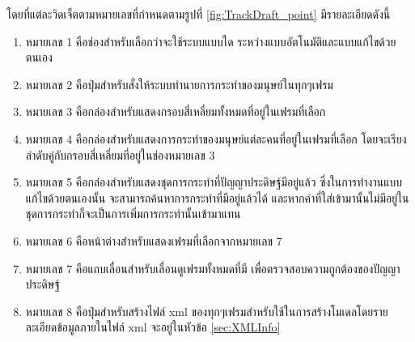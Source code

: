 โดยที่แต่ละวิดเจ็ตตามหมายเลขที่กำหนดตามรูปที่ \ref{fig:TrackDraft_point} มีรายละเอียดดังนี้
\begin{enumerate}
	\setlength\itemsep{-0.25em}
    \item หมายเลข 1 คือช่องสำหรับเลือกว่าจะใช้ระบบแบบใด ระหว่างแบบอัตโนมัติและแบบแก้ไขด้วยตนเอง
    \item หมายเลข 2 คือปุ่มสำหรับสั่งให้ระบบทำนายการกระทำของมนุษย์ในทุกๆเฟรม
    \item หมายเลข 3 คือกล่องสำหรับแสดงกรอบสี่เหลี่ยมทั้งหมดที่อยู่ในเฟรมที่เลือก
	\item หมายเลข 4 คือกล่องสำหรับแสดงการกระทำของมนุษย์แต่ละคนที่อยู่ในเฟรมที่เลือก โดยจะเรียงลำดับคู่กับกรอบสี่เหลี่ยมที่อยู่ในช่องหมายเลข 3
    \item หมายเลข 5 คือกล่องสำหรับแสดงชุดการกระทำที่ปัญญาประดิษฐ์มีอยู่แล้ว ซึ่งในการทำงานแบบแก้ไขด้วยตนเองนั้น จะสามารถค้นหาการกระทำที่มีอยู่แล้วได้ 
    และหากคำที่ใส่เข้ามานั้นไม่มีอยู่ในชุดการกระทำก็จะเป็นการเพิ่มการกระทำนั้นเข้ามาแทน
	\item หมายเลข 6 คือหน้าต่างสำหรับแสดงเฟรมที่เลือกจากหมายเลข 7
	\item หมายเลข 7 คือแถบเลื่อนสำหรับเลื่อนดูเฟรมทั้งหมดที่มี เพื่อตรวจสอบความถูกต้องของปัญญาประดิษฐ์
	\item หมายเลข 8 คือปุ่มสำหรับสร้างไฟล์ xml ของทุกๆเฟรมสำหรับใช้ในการสร้างโมเดลโดยรายละเอียดข้อมูลภายในไฟล์ xml จะอยู่ในหัวข้อ \ref{sec:XMLInfo}
\end{enumerate}
\clearpage

